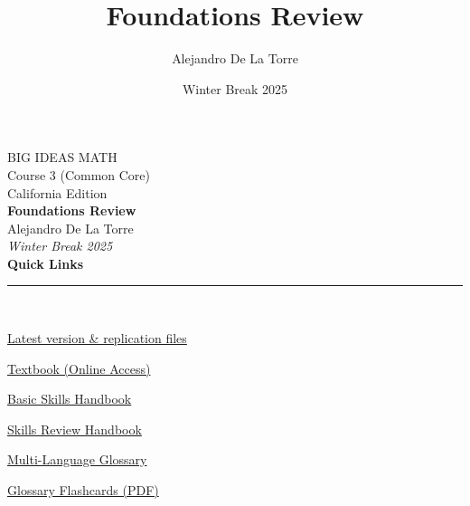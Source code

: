 \documentclass[12pt,twoside]{report}
\title{Foundations Review}
\author{Alejandro De La Torre}
\date{Winter Break 2025}
\begin{document}
\begin{titlepage}
  \thispagestyle{empty}
  \begin{center}
    {\Large BIG IDEAS MATH}\\[0.5em]
    {\large Course 3 (Common Core)}\\[0.5em]
    {\large California Edition}\\[1.25em]

    {\LARGE \textbf{Foundations Review}}\\[1.25em]

    {\large Alejandro De La Torre}\\[0.75em]

    {\large \textit{Winter Break 2025}}\\[2em]

    {\large \textbf{Quick Links}}\\[0.75em]
    \rule{0.75\textwidth}{0.4pt}\\[1.0em]

\begingroup
\setlength{\parindent}{0pt}
\vspace*{-0.5\baselineskip}

\begin{tcolorbox}[
  enhanced,
  colback=white,
  colframe=black!10,
  boxrule=0pt,
  left=0pt,right=0pt,top=0pt,bottom=0pt,
]
\begin{tcbraster}[raster columns=2, raster column skip=6mm, raster row skip=4mm]
  \begin{tcolorbox}[linkbutton]
    \href{MATH 421/Homeworks/LIZBETH/Foundations Review/master_review.pdf}{Latest version \& replication files}
  \end{tcolorbox}
  \begin{tcolorbox}[linkbutton]
    \href{https://bim.easyaccessmaterials.com/protected/content/dcs_ca/g8/g8.html}{Textbook (Online Access)}
  \end{tcolorbox}
  \begin{tcolorbox}[linkbutton]
    \href{https://bim.easyaccessmaterials.com/protected/content/dcs_ca/bsh/index.html}{Basic Skills Handbook}
  \end{tcolorbox}
  \begin{tcolorbox}[linkbutton]
    \href{https://bim.easyaccessmaterials.com/protected/content/dcs_ca/srh/index.html}{Skills Review Handbook}
  \end{tcolorbox}
  \begin{tcolorbox}[linkbutton]
    \href{https://static.bigideasmath.com/protected/content/mlg/ccms/g8.php}{Multi-Language Glossary}
  \end{tcolorbox}
  \begin{tcolorbox}[linkbutton]
    \href{https://bim.easyaccessmaterials.com/protected/content/dcs_ca/flashcards/glossary_flashcards_g8.pdf}{Glossary Flashcards (PDF)}
  \end{tcolorbox}
\end{tcbraster}
\end{tcolorbox}


\end{center}
\end{titlepage}
\end{document}
